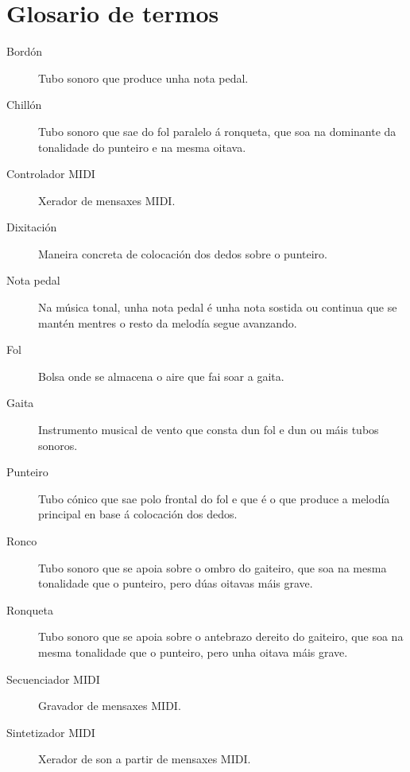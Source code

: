 \chapter{Glosario de termos}
\label{chap:glosario-terminos}


\begin{description}
 \item [Bordón] Tubo sonoro que produce unha nota pedal.
 \item [Chillón] Tubo sonoro que sae do fol paralelo á ronqueta, que soa na
       dominante da tonalidade do punteiro e na mesma oitava.
 \item [Controlador MIDI] Xerador de mensaxes MIDI.
 \item [Dixitación] Maneira concreta de colocación dos dedos sobre o punteiro.
 \item [Nota pedal] Na música tonal, unha nota pedal é unha nota sostida ou
       continua que se mantén mentres o resto da melodía segue avanzando.
 \item [Fol] Bolsa onde se almacena o aire que fai soar a gaita.
 \item [Gaita] Instrumento musical de vento que consta dun fol e dun ou máis
       tubos sonoros.
 \item [Punteiro] Tubo cónico que sae polo frontal do fol e que é o que produce
       a melodía principal en base á colocación dos dedos.
 \item [Ronco] Tubo sonoro que se apoia sobre o ombro do gaiteiro, que soa na
       mesma tonalidade que o punteiro, pero dúas oitavas máis grave.
 \item [Ronqueta] Tubo sonoro que se apoia sobre o antebrazo dereito do
       gaiteiro, que soa na mesma tonalidade que o punteiro, pero unha oitava
       máis grave.
 \item [Secuenciador MIDI] Gravador de mensaxes MIDI.
 \item [Sintetizador MIDI] Xerador de son a partir de mensaxes MIDI.
\end{description}
